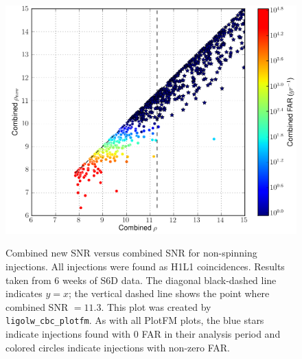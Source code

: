 \begin{figure}[p]
\center
\includegraphics[width=6in]{figures/ligo_south/H1L1-ligolw_cbc_plotfm_Non-Spinning_mathcalM_mathrminj_0_3_F1_BNSLININJ+BNSLOGINJ+NSBHLININJ+NSBHLOGINJ+BBHLININJ+BBHLOGINJ_PLOTTED-961545543-3628944.png}
\label{fig:ligo_south-newsnr_v_snr}
\caption{Combined new \ac{SNR} versus combined \ac{SNR} for non-spinning injections. All injections were found as H1L1 coincidences. Results taken from $6$ weeks of S6D data. The diagonal black-dashed line indicates $y=x$; the vertical dashed line shows the point where combined \ac{SNR} $= 11.3$. This plot was created by \texttt{ligolw\_cbc\_plotfm}. As with all PlotFM plots, the blue stars indicate injections found with $0$ \ac{FAR} in their analysis period and colored circles indicate injections with non-zero \ac{FAR}.}
\end{figure}

